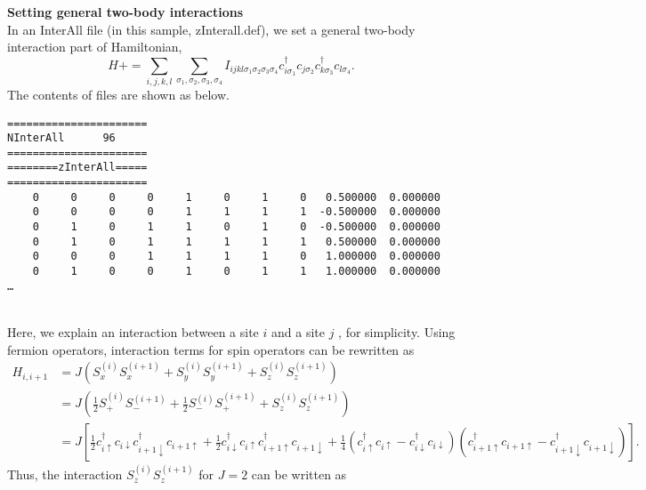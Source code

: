 \begin{description}
\item {\bf Setting general two-body interactions}\\
In an InterAll file (in this sample, zInterall.def), we set a general two-body interaction part of Hamiltonian,
\begin{equation}
H+=\sum_{i,j,k,l}\sum_{\sigma_1,\sigma_2, \sigma_3, \sigma_4}
I_{ijkl\sigma_1\sigma_2\sigma_3\sigma_4}c_{i\sigma_1}^{\dagger}c_{j\sigma_2}c_{k\sigma_3}^{\dagger}c_{l\sigma_4}.
\end{equation}
The contents of files are shown as below.\\
\begin{minipage}{16cm}
\begin{screen}
\begin{verbatim}
====================== 
NInterAll      96  
====================== 
========zInterAll===== 
====================== 
    0     0     0     0     1     0     1     0   0.500000  0.000000
    0     0     0     0     1     1     1     1  -0.500000  0.000000
    0     1     0     1     1     0     1     0  -0.500000  0.000000
    0     1     0     1     1     1     1     1   0.500000  0.000000
    0     0     0     1     1     1     1     0   1.000000  0.000000
    0     1     0     0     1     0     1     1   1.000000  0.000000
…
\end{verbatim}
\end{screen}
\end{minipage}
~\\
Here, we explain an interaction between a site $i$ and a site $j$ , for simplicity. Using fermion operators, interaction terms for spin operators can be rewritten as
\begin{align}
H_{i,i+1}&=J(S_x^{(i)}S_x^{(i+1)}+S_y^{(i)}S_y^{(i+1)}+S_z^{(i)}S_z^{(i+1)}) \nonumber\\
&=J \left( \frac{1}{2}S_+^{(i)}S_-^{(i+1)}+\frac{1}{2}S_-^{(i)}S_+^{(i+1)}+S_z^{(i)}S_z^{(i+1)} \right) \nonumber\\
&=J \left[ \frac{1}{2}c_{i\uparrow}^{\dag}c_{i\downarrow}c_{i+1\downarrow}^{\dag}c_{i+1\uparrow}+\frac{1}{2}c_{i\downarrow}^{\dag}c_{i\uparrow}c_{i+1\uparrow}^{\dag}c_{i+1\downarrow}+\frac{1}{4}(c_{i\uparrow}^{\dag}c_{i\uparrow}-c_{i\downarrow}^{\dag}c_{i\downarrow})(c_{i+1\uparrow}^{\dag}c_{i+1\uparrow}-c_{i+1\downarrow}^{\dag}c_{i+1\downarrow}) \right]. \nonumber 
\end{align}
Thus, the interaction $S_z^{(i)}S_z^{(i+1)}$ for $J=2$ can be written as \\
\begin{minipage}{16cm}

\end{minipage}
\end{description}
